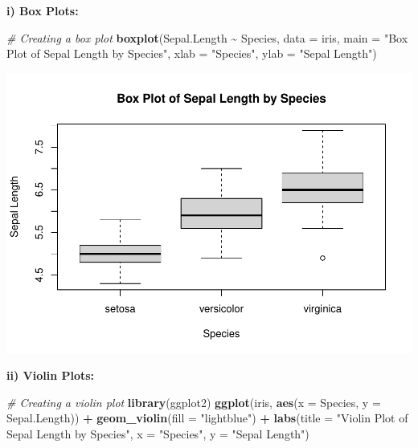 \documentclass[
]{book}
\newenvironment{Shaded}{\begin{snugshade}}{\end{snugshade}}
\newcommand{\AttributeTok}[1]{\textcolor[rgb]{0.13,0.29,0.53}{#1}}
\newcommand{\CommentTok}[1]{\textcolor[rgb]{0.56,0.35,0.01}{\textit{#1}}}
\newcommand{\FunctionTok}[1]{\textcolor[rgb]{0.13,0.29,0.53}{\textbf{#1}}}
\newcommand{\NormalTok}[1]{#1}
\newcommand{\SpecialCharTok}[1]{\textcolor[rgb]{0.81,0.36,0.00}{\textbf{#1}}}
\newcommand{\StringTok}[1]{\textcolor[rgb]{0.31,0.60,0.02}{#1}}
\begin{document}
\textbf{i) Box Plots:}

\begin{Shaded}
\begin{Highlighting}[]
\CommentTok{\# Creating a box plot}
\FunctionTok{boxplot}\NormalTok{(Sepal.Length }\SpecialCharTok{\textasciitilde{}}\NormalTok{ Species, }\AttributeTok{data =}\NormalTok{ iris, }
        \AttributeTok{main =} \StringTok{"Box Plot of Sepal Length by Species"}\NormalTok{,}
        \AttributeTok{xlab =} \StringTok{"Species"}\NormalTok{, }\AttributeTok{ylab =} \StringTok{"Sepal Length"}\NormalTok{)}
\end{Highlighting}
\end{Shaded}

\includegraphics{_main_files/figure-latex/unnamed-chunk-67-1.pdf}

\textbf{ii) Violin Plots:}

\begin{Shaded}
\begin{Highlighting}[]
\CommentTok{\# Creating a violin plot}
\FunctionTok{library}\NormalTok{(ggplot2)}
\FunctionTok{ggplot}\NormalTok{(iris, }\FunctionTok{aes}\NormalTok{(}\AttributeTok{x =}\NormalTok{ Species, }\AttributeTok{y =}\NormalTok{ Sepal.Length)) }\SpecialCharTok{+}
  \FunctionTok{geom\_violin}\NormalTok{(}\AttributeTok{fill =} \StringTok{"lightblue"}\NormalTok{) }\SpecialCharTok{+}
  \FunctionTok{labs}\NormalTok{(}\AttributeTok{title =} \StringTok{"Violin Plot of Sepal Length by Species"}\NormalTok{,}
       \AttributeTok{x =} \StringTok{"Species"}\NormalTok{, }\AttributeTok{y =} \StringTok{"Sepal Length"}\NormalTok{)}
\end{Highlighting}
\end{Shaded}
\end{document}
